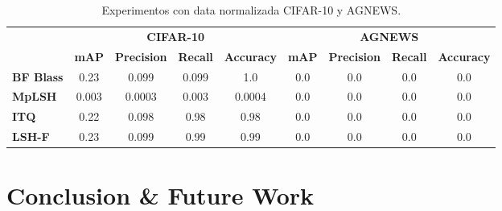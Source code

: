 \documentclass{article}
\begin{document}
            	
\begin{table}[ht]
\caption{Experimentos con data normalizada CIFAR-10 y AGNEWS. }
\label{table:map}
\centering
\begin{footnotesize}
\begin{tabular}{l|c|c|c|c|c|c|c|c|}
\cline{2-9}
                                           & \multicolumn{4}{c|}{\textbf{CIFAR-10}}            & \multicolumn{4}{c|}{\textbf{AGNEWS}} \\ \cline{2-9} 
                                           & \textbf{mAP} & \textbf{Precision} & \textbf{Recall} & \textbf{Accuracy} & \textbf{mAP} & \textbf{Precision} & \textbf{Recall} & \textbf{Accuracy}\\ \hline
\multicolumn{1}{|l|}{\textbf{BF Blass  \cite{multiprobe}}}       & 0.23        & 0.099  & 0.099 & 1.0    & 0.0         & 0.0            & 0.0    & 0.0\\ \hline
\multicolumn{1}{|l|}{\textbf{MpLSH \cite{itq}}}         & 0.003         & 0.0003    & 0.003        & 0.0004      & 0.0         & 0.0            & 0.0    & 0.0  \\ \hline
\multicolumn{1}{|l|}{\textbf{ITQ \cite{lopq}}}        & 0.22         & 0.098            & 0.98  & 0.98      & 0.0         & 0.0            & 0.0    & 0.0\\ \hline
\multicolumn{1}{|l|}{\textbf{LSH-F \cite{lshforest}}}       & 0.23         & 0.099            & 0.99  &  0.99    & 0.0         & 0.0            & 0.0 & 0.0  \\ \hline
\end{tabular}
\end{footnotesize}
\end{table}



\section{Conclusion \& Future Work}
 



\end{document}
